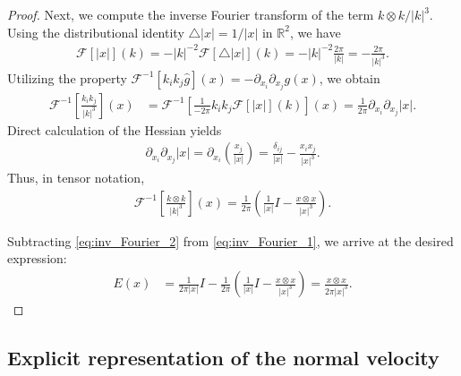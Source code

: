 \documentclass{article}
\theoremstyle{remark}
\theoremstyle{definition}
\numberwithin{equation}{section}
\begin{document}
\begin{proof}
    Next, we compute the inverse Fourier transform of the term $k\otimes k/|k|^3$.
    Using the distributional identity $\triangle|x| = 1/|x|$ in $\mathbb{R}^2$, we have
    \begin{align*}
        \mathcal{F}[|x|](k) = -|k|^{-2} \mathcal{F}[\triangle|x|](k) = -|k|^{-2} \frac{2\pi}{|k|} = -\frac{2\pi}{|k|^3}.
    \end{align*}
    Utilizing the property $\mathcal{F}^{-1}[k_i k_j \hat{g}](x) = -\partial_{x_i}\partial_{x_j} g(x)$, we obtain
    \begin{align*}
        \mathcal{F}^{-1}\left[\frac{k_i k_j}{|k|^3}\right](x)
        &= \mathcal{F}^{-1}\left[ \frac{1}{-2\pi} k_i k_j \mathcal{F}[|x|](k) \right](x)
        = \frac{1}{2\pi} \partial_{x_i}\partial_{x_j}|x|.
    \end{align*}
    Direct calculation of the Hessian yields
    \begin{align*}
        \partial_{x_i}\partial_{x_j}|x| = \partial_{x_i}\left(\frac{x_j}{|x|}\right) = \frac{\delta_{ij}}{|x|} - \frac{x_i x_j}{|x|^3}.
    \end{align*}
    Thus, in tensor notation,
    \begin{align}
        \mathcal{F}^{-1}\left[\frac{k\otimes k}{|k|^3}\right](x) = \frac{1}{2\pi}\left(\frac{1}{|x|}I - \frac{x\otimes x}{|x|^3}\right).
    \label{eq:inv_Fourier_2}
    \end{align}

    Subtracting \eqref{eq:inv_Fourier_2} from \eqref{eq:inv_Fourier_1}, we arrive at the desired expression:
    \begin{align*}
        E(x) &= \frac{1}{2\pi|x|}I - \frac{1}{2\pi}\left(\frac{1}{|x|}I - \frac{x\otimes x}{|x|^3}\right)
        = \frac{x\otimes x}{2\pi|x|^3}.
    \end{align*}
\end{proof}


\subsection{Explicit representation of the normal velocity}
\end{document}
